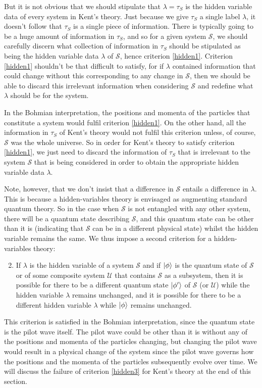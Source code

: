 But it is not obvious that we should stipulate that $\lambda=\tau_S$ is the hidden variable data of every system in Kent's theory. Just because we give $\tau_S$ a single label $\lambda$, it doesn't follow that $\tau_S$ is a single piece of information. There is typically going to be a huge amount of information in $\tau_S$, and so for a given system $\mathcal{S}$, we should carefully discern  what collection of information in $\tau_S$ should be stipulated as being the hidden variable data $\lambda$ of $\mathcal{S}$, hence criterion \ref{hidden1}. Criterion \ref{hidden1} shouldn't be that difficult to satisfy, for if $\lambda$ contained information that could change without this corresponding to any change in $\mathcal{S}$, then we should be able to discard this irrelevant information when considering $\mathcal{S}$ and redefine what $\lambda$ should be for the system. 

In the Bohmian interpretation, the positions and momenta of the particles that constitute a system would fulfil criterion \ref{hidden1}. On the other hand, all the information in $\tau_S$ of Kent's theory would not fulfil this criterion unless, of course, $\mathcal{S}$ was the whole universe. So in order for Kent's theory to satisfy criterion \ref{hidden1}, we just need to discard the information of $\tau_S$ that is irrelevant to the system $\mathcal{S}$ that is being considered in order to obtain the appropriate hidden variable data $\lambda$. 

Note, however, that we don't insist that a difference in $\mathcal{S}$ entails a difference in $\lambda$. This is because a hidden-variables theory is envisaged as augmenting standard quantum theory. So in the case when $\mathcal{S}$ is not entangled with any other system, there will be a quantum state describing $\mathcal{S}$, and this quantum state can be other than it is (indicating that $\mathcal{S}$ can be in a different physical state)  whilst the hidden variable remains the same. We thus impose a second criterion for a hidden-variables theory:
\begin{enumerate}
	\setcounter{enumi}{1}
	\item \label{hidden3} If $\lambda$ is the hidden variable of a system $\mathcal{S}$ and if $\ket{\phi}$ is the quantum state of $\mathcal{S}$ or of some composite system $\mathcal{U}$ that contains $\mathcal{S}$ as a subsystem, then it is possible for there to be a different quantum state $\ket{\phi'}$ of $\mathcal{S}$ (or $\mathcal{U}$) while the hidden variable $\lambda$ remains unchanged, and it is possible for there to be a different hidden variable $\lambda$ while $\ket{\phi}$ remains unchanged.
\end{enumerate} 
This criterion is satisfied in the Bohmian interpretation, since the quantum state is the pilot wave itself. The pilot wave could be other than it is without any of the positions and momenta of the particles changing, but changing the pilot wave would result in a physical change of the system since the pilot wave governs how  the positions and the momenta of the particles subsequently evolve over time. We will discuss the failure of criterion \ref{hidden3} for Kent's theory at the end of this section.

